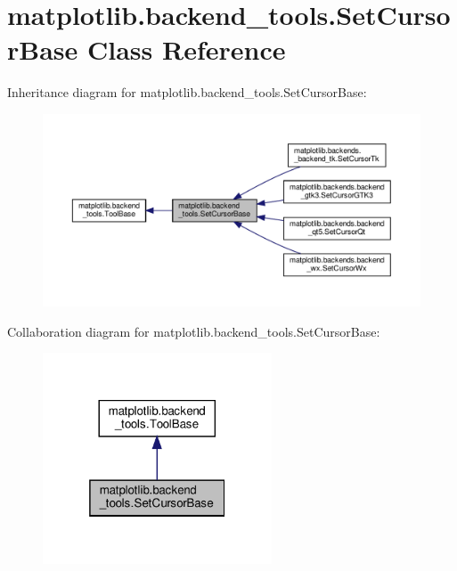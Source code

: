 \hypertarget{classmatplotlib_1_1backend__tools_1_1SetCursorBase}{}\section{matplotlib.\+backend\+\_\+tools.\+Set\+Cursor\+Base Class Reference}
\label{classmatplotlib_1_1backend__tools_1_1SetCursorBase}


Inheritance diagram for matplotlib.\+backend\+\_\+tools.\+Set\+Cursor\+Base\+:
\nopagebreak
\begin{figure}[H]
\begin{center}
\leavevmode
\includegraphics[width=350pt]{classmatplotlib_1_1backend__tools_1_1SetCursorBase__inherit__graph}
\end{center}
\end{figure}


Collaboration diagram for matplotlib.\+backend\+\_\+tools.\+Set\+Cursor\+Base\+:
\nopagebreak
\begin{figure}[H]
\begin{center}
\leavevmode
\includegraphics[width=193pt]{classmatplotlib_1_1backend__tools_1_1SetCursorBase__coll__graph}
\end{center}
\end{figure}
